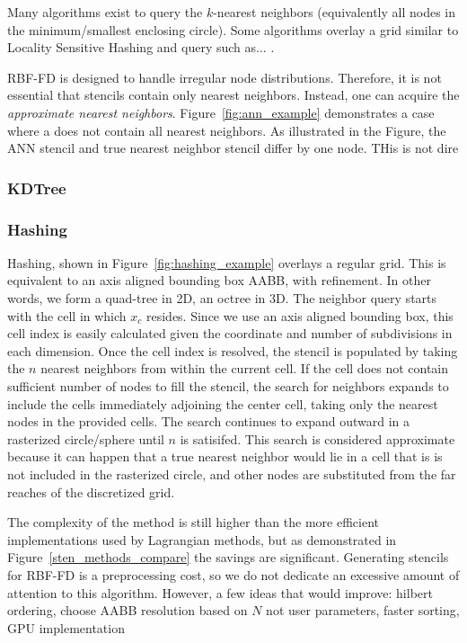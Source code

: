 \documentclass[11pt]{report}
\begin{document}
{Many algorithms exist to query the $k$-nearest neighbors (equivalently all nodes in the minimum/smallest enclosing circle). Some algorithms overlay a grid similar to Locality Sensitive Hashing and query such as... \cite{HarPeledMazumdar2003}.

RBF-FD is designed to handle irregular node distributions. Therefore, it is not essential that stencils contain only nearest neighbors. Instead, one can acquire the \emph{approximate nearest neighbors}. Figure~\ref{fig:ann_example} demonstrates a case where a does not contain all nearest neighbors. As illustrated in the Figure, the ANN stencil and true nearest neighbor stencil differ by one node. THis is not dire


\subsubsection{KDTree}

\subsubsection{Hashing}

Hashing, shown in Figure~\ref{fig:hashing_example} overlays a regular grid. This is equivalent to an axis aligned bounding box AABB, with refinement. In other words, we form a quad-tree in 2D, an octree in 3D. The neighbor query starts with the cell in which $x_c$ resides. Since we use an axis aligned bounding box, this cell index is easily calculated given the coordinate and number of subdivisions in each dimension. Once the cell index is resolved, the stencil is populated by taking the $n$ nearest neighbors from within the current cell. If the cell does not contain sufficient number of nodes to fill the stencil, the search for neighbors expands to include the cells immediately adjoining the center cell, taking only the nearest nodes in the provided cells. The search continues to expand outward in a rasterized circle/sphere until $n$ is satisifed. This search is considered approximate because it can happen that a true nearest neighbor would lie in a cell that is is not included in the rasterized circle, and other nodes are substituted from the far reaches of the discretized grid.

The complexity of the method is still higher than the more efficient implementations used by Lagrangian methods, but as demonstrated in Figure~\ref{sten_methods_compare} the savings are significant. Generating stencils for RBF-FD is a preprocessing cost, so we do not dedicate an excessive amount of attention to this algorithm. However, a few ideas that would improve: hilbert ordering, choose AABB resolution based on $N$ not user parameters, faster sorting, GPU implementation


}
\end{document}
